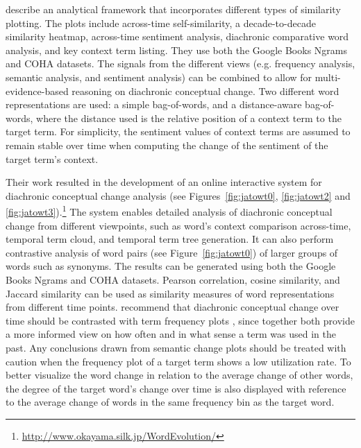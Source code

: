 \documentclass[output=paper]{langsci/langscibook}
\begin{document}
\begin{sloppypar}
\citet{jatowt:2014:fas:2740769.2740809} describe an analytical framework that incorporates different types of similarity plotting. The plots include across-time self-similarity, a decade-to-decade similarity heatmap, across-time sentiment analysis, diachronic comparative word analysis, and key context term listing. They use both the Google Books Ngrams and COHA datasets. The signals from the different views (e.g. frequency analysis, semantic analysis, and sentiment analysis) can be combined to allow for multi-evidence-based reasoning on diachronic conceptual change. Two different word representations are used: a simple bag-of-words, and a distance-aware bag-of-words, where the distance used is the relative position of a context term to the target term. For simplicity, the sentiment values of context terms are assumed to remain stable over time when computing the change of the sentiment of the target term's context. 
\end{sloppypar}

Their work resulted in the development of an online interactive system for diachronic conceptual change analysis \citep{jatowt2018every} (see Figures~\ref{fig:jatowt0}, \ref{fig:jatowt2} and \ref{fig:jatowt3}).\footnote{\url{http://www.okayama.silk.jp/WordEvolution/}} The system enables detailed analysis of diachronic conceptual change from different viewpoints, such as word's context comparison across-time, temporal term cloud, and temporal term tree generation. It can also perform contrastive analysis of word pairs (see Figure~\ref{fig:jatowt0}) of larger groups of words such as synonyms. The results can be generated using both the Google Books Ngrams and COHA datasets. Pearson correlation, cosine similarity, and Jaccard similarity can be used as similarity measures of word representations from different time points. \citet{jatowt2018every} recommend that diachronic conceptual change over time should be contrasted with term frequency plots \citep[as also suggested by][]{kim-etal-2014-temporal}, since together both provide a more informed view on how often and in what sense a term was used in the past. Any conclusions drawn from semantic change plots should be treated with caution when the frequency plot of a target term shows a low utilization rate. To better visualize the word change in relation to the average change of other words, the degree of the target word's change over time is also displayed with reference to the average change of words in the same frequency bin as the target word.
\end{document}
